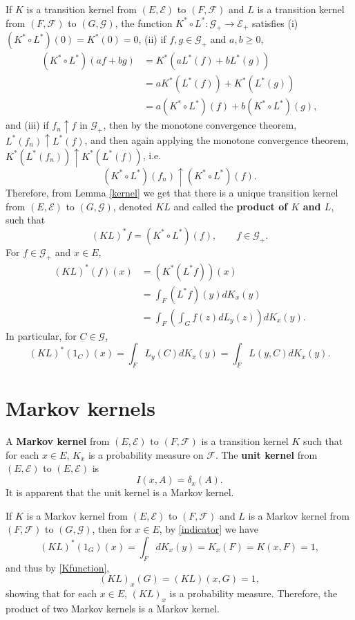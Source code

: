 \documentclass{article}
\theoremstyle{definition}
\begin{document}
If $K$ is a transition kernel from $(E,\mathscr{E})$ to $(F,\mathscr{F})$ and
$L$ is a transition kernel from
$(F,\mathscr{F})$ to $(G,\mathscr{G})$, 
the function $K^* \circ L^*:\mathscr{G}_+ \to \mathscr{E}_+$ satisfies 
(i) $(K^* \circ L^*)(0)=K^*(0)=0$,
(ii) if $f,g \in \mathscr{G}_+$ and $a,b \geq 0$,
\begin{align*}
(K^* \circ L^*)(af+bg) &= K^*(aL^*(f)+bL^*(g))\\
&= aK^*(L^*(f))+K^*(L^*(g))\\
&=a(K^* \circ L^*)(f)+b(K^* \circ L^*)(g),
\end{align*}
and (iii) if $f_n \uparrow f$ in $\mathscr{G}_+$,
then by the monotone convergence theorem, $L^*(f_n) \uparrow L^*(f)$, and then
again applying the monotone convergence theorem, $K^*(L^*(f_n)) \uparrow K^*(L^*(f))$,
i.e. 
\[
(K^* \circ L^*)(f_n) \uparrow (K^* \circ L^*)(f).
\]
Therefore, from Lemma \ref{kernel} we get that there is a unique transition kernel
from $(E,\mathscr{E})$ to $(G,\mathscr{G})$,
denoted $KL$ and called the \textbf{product of $K$ and $L$},
 such that
\[
(KL)^* f  = (K^* \circ L^*)(f), \qquad f \in \mathscr{G}_+.
\]
For $f \in \mathscr{G}_+$ and $x \in E$,
\begin{align*}
(KL)^*(f)(x)&=(K^*(L^* f))(x)\\
&=\int_F (L^*f)(y) dK_x(y)\\
&=\int_F \left( \int_G f(z) dL_y(z) \right) dK_x(y).
\end{align*}
In particular, for $C \in \mathscr{G}$,
\begin{equation}
(KL)^*(1_C)(x) = \int_F L_y(C) dK_x(y)
=\int_F L(y,C) dK_x(y).
\label{indicator}
\end{equation}


\section{Markov kernels}
A \textbf{Markov kernel} from $(E,\mathscr{E})$ to $(F,\mathscr{F})$ is a transition kernel $K$ such that
for each $x \in E$, $K_x$ is a probability measure on $\mathscr{F}$. 
The \textbf{unit kernel} from $(E,\mathscr{E})$ to $(E,\mathscr{E})$ is
\begin{equation}
I(x,A) = \delta_x(A).
\label{unitkernel}
\end{equation}
It is apparent that the unit kernel is a Markov kernel.

If $K$ is a Markov kernel from $(E,\mathscr{E})$ to $(F,\mathscr{F})$ and
$L$ is a Markov kernel from
$(F,\mathscr{F})$ to $(G,\mathscr{G})$, then
for $x \in E$, by \eqref{indicator} we have
\[
(KL)^*(1_G)(x) = \int_F dK_x(y) = K_x(F) = K(x,F) = 1,
\]
and thus by \eqref{Kfunction},
\[
(KL)_x(G) = (KL)(x,G) = 1,
\]
showing that for each $x \in E$, $(KL)_x$ is a probability measure. Therefore,
the product of two Markov kernels is a Markov kernel.
\end{document}
